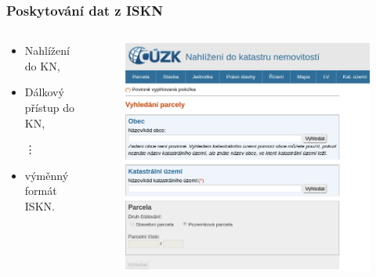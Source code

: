 \documentclass{beamer}
\begin{document}
\begin{frame}
 \frametitle{Poskytování dat z ISKN}
 



\begin{columns}[onlytextwidth]
  \begin{column}{0.4\textwidth}
  
    \begin{itemize}
      \item Nahlížení do KN,
      \item Dálkový přístup do KN,
      
      \hspace{30pt}\vdots
      
      \item výměnný formát ISKN.      
    \end{itemize}
    
  \end{column}
  
  \begin{column}{0.6\textwidth}
    \begin{figure}
      \includegraphics[width=1\textwidth]{images/nahlizeniDoKN.png}
    \end{figure}
  \end{column}

\end{columns}

\end{frame}
\end{document}
